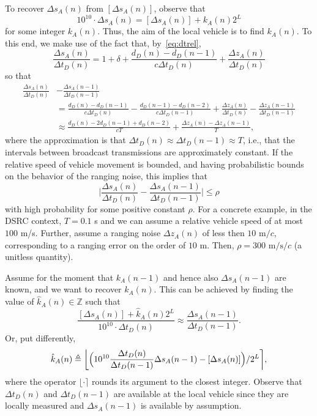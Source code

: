 \documentclass[12pt,journal,final,onecolumn]{IEEEtran}
\newcommand{\defeq}{\mathrel{\triangleq}}
\newcommand{\Z}{\mathbb{Z}}
\theoremstyle{definition}
\theoremstyle{myremark}
\newcommand{\dtd}{\Delta t_D}
\newcommand{\dsa}{\Delta s_A}
\begin{document}
To recover $\dsa(n)$ from $[\dsa(n)]$, observe that
\begin{equation*}
    10^{10}\cdot\dsa(n) = [\dsa(n)]+k_A(n) 2^L
\end{equation*} 
for some integer $k_A(n)$. Thus, the aim of the local vehicle is to find
$k_A(n)$. To this end, we make use of the fact that, by~\eqref{eq:dtrel},
\begin{equation}
    \label{eq:ratio}
    \frac{\dsa(n)}{\dtd(n)} 
    = 1+\delta+\frac{d_D(n)-d_D(n-1)}{c\dtd(n)}+\frac{\Delta z_A(n)}{\dtd(n)}
\end{equation}
so that
\begin{align*}
    \frac{\dsa(n)}{\dtd(n)} & -\frac{\dsa(n-1)}{\dtd(n-1)} \\
    & = \frac{d_D(n)-d_D(n-1)}{c\dtd(n)}-\frac{d_D(n-1)-d_D(n-2)}{c\dtd(n-1)} 
    +\frac{\Delta z_A(n)}{\dtd(n)} -\frac{\Delta z_A(n-1)}{\dtd(n-1)} \\
    & \approx \frac{d_D(n)-2d_D(n-1)+d_D(n-2)}{cT} 
    +\frac{\Delta z_A(n)-\Delta z_A(n-1)}{T},
\end{align*}
where the approximation is that $\dtd(n)\approx\dtd(n-1)\approx T$, i.e., that
the intervals between broadcast transmissions are approximately constant.  If
the relative speed of vehicle movement is bounded, and having probabilistic
bounds on the behavior of the ranging noise, this implies that
\begin{equation}
    \label{eq:ratiobound}
    \bigg\lvert \frac{\dsa(n)}{\dtd(n)} - \frac{\dsa(n-1)}{\dtd(n-1)}\bigg\rvert \leq \rho
\end{equation}
with high probability for some positive constant $\rho$.  For a concrete example,
in the DSRC context, $T = 0.1$ s and we can assume a relative vehicle speed of
at most $100$ m/s. Further, assume a ranging noise $\Delta z_A(n)$ of less then
$10 \text{ m}/c$, corresponding to a ranging error on the order of $10$ m. Then,
$\rho = 300 \text{ m/s}/c$ (a unitless quantity).

Assume for the moment that $k_A(n-1)$ and hence also $\dsa(n-1)$ are known, and
we want to recover $k_A(n)$. This can be achieved by finding the value of
$\hat{k}_A(n)\in\Z$ such that
\begin{equation*}
    \frac{[\dsa(n)]+\hat{k}_A(n)2^L}{10^{10}\cdot\dtd(n)} \approx \frac{\dsa(n-1)}{\dtd(n-1)}.
\end{equation*}
Or, put differently,
\begin{equation*}
    \hat{k}_A(n) 
    \defeq \bigg\lfloor 
    \Bigl( 10^{10}\frac{\dtd(n)}{\dtd(n-1)}\dsa(n-1)-[\dsa(n)]\Bigr)/2^L 
    \bigg\rceil,
\end{equation*}
where the operator $\lfloor\cdot\rceil$ rounds its argument to the closest
integer. Observe that $\dtd(n)$ and $\dtd(n-1)$ are available at the local
vehicle since they are locally measured and $\dsa(n-1)$ is available by
assumption.
\end{document}
